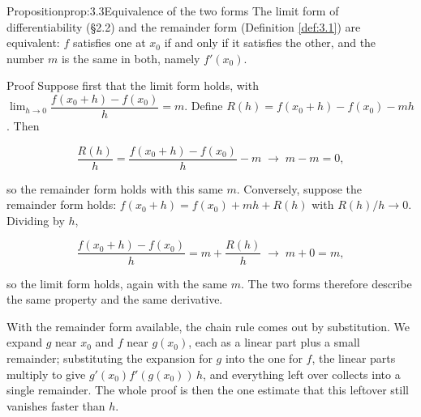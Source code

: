\documentclass[a4paper,12pt,oneside]{memoir}
\begin{document}
\begin{envproposition}{Proposition}{prop:3.3}{Equivalence of the two forms}
The limit form of differentiability (§2.2) and the remainder form (Definition \ref{def:3.1}) are equivalent: \(f\) satisfies one at \(x_{0}\) if and only if it satisfies the other, and the number \(m\) is the same in both, namely \(f'(x_{0})\).
\end{envproposition}
\begin{envproof}{Proof}{}{}
Suppose first that the limit form holds, with \(\lim_{h \to 0}\dfrac{f(x_{0}+h) - f(x_{0})}{h} = m\). Define \(R(h) = f(x_{0}+h) - f(x_{0}) - m h\). Then

\[ \frac{R(h)}{h} = \frac{f(x_{0}+h) - f(x_{0})}{h} - m \;\longrightarrow\; m - m = 0, \]

so the remainder form holds with this same \(m\). Conversely, suppose the remainder form holds: \(f(x_{0}+h) = f(x_{0}) + m h + R(h)\) with \(R(h)/h \to 0\). Dividing by \(h\),

\[ \frac{f(x_{0}+h) - f(x_{0})}{h} = m + \frac{R(h)}{h} \;\longrightarrow\; m + 0 = m, \]

so the limit form holds, again with the same \(m\). The two forms therefore describe the same property and the same derivative.
\end{envproof}
With the remainder form available, the chain rule comes out by substitution. We expand \(g\) near \(x_{0}\) and \(f\) near \(g(x_{0})\), each as a linear part plus a small remainder; substituting the expansion for \(g\) into the one for \(f\), the linear parts multiply to give \(g'(x_{0})f'(g(x_{0}))\,h\), and everything left over collects into a single remainder. The whole proof is then the one estimate that this leftover still vanishes faster than \(h\).
\end{document}
